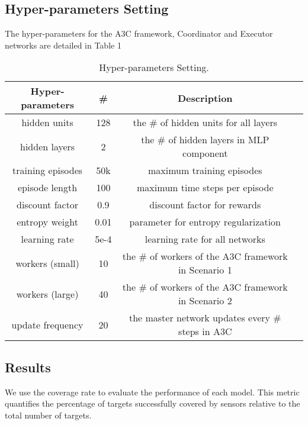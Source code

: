 \documentclass[preprint,12pt]{elsarticle}
\begin{document}
\subsection{Hyper-parameters Setting}
The hyper-parameters for the A3C framework, Coordinator and Executor networks are detailed in Table 1
\begin{table}[ht]
\caption{Hyper-parameters Setting.}
\centering
\footnotesize
\begin{tabular}{cccc}
\hline
\textbf{Hyper-parameters} & \textbf{\#} & \textbf{Description} \\
\hline
hidden units & 128 & the \# of hidden units for all layers \\

hidden layers & 2 & the \# of hidden layers in MLP component\\

training episodes & 50k & maximum training episodes \\

episode length & 100 & maximum time steps per episode \\

discount factor & 0.9 & discount factor for rewards \\

entropy weight & 0.01 & parameter for entropy regularization \\

learning rate & 5e-4 & learning rate for all networks \\

workers (small) & 10 & the \# of workers of the A3C framework in Scenario 1 \\

workers (large) & 40 & the \# of workers of the A3C framework in Scenario 2 \\

update frequency & 20 & the master network updates every \# steps in A3C \\
\hline
\end{tabular}
\end{table}
\subsection{Results}

We use the coverage rate to evaluate the performance of each model. This metric quantifies the percentage of targets successfully covered by sensors relative to the total number of targets.
\end{document}

